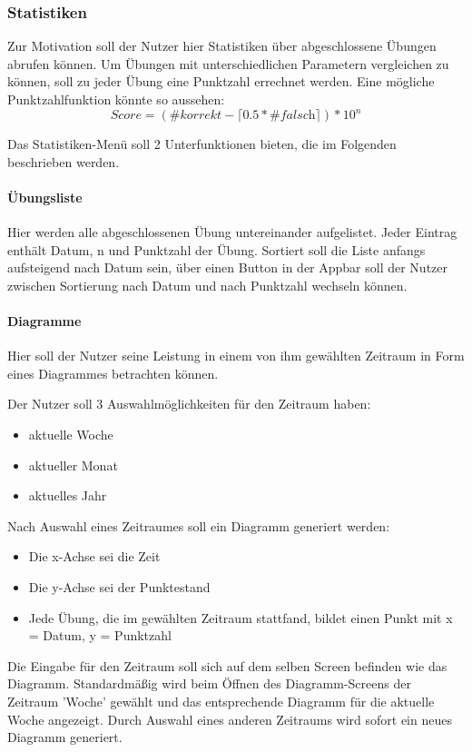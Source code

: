 \subsubsection{Statistiken}\label{statistiken}
Zur Motivation soll der Nutzer hier Statistiken über abgeschlossene Übungen abrufen können.
Um Übungen mit unterschiedlichen Parametern vergleichen zu können, soll zu jeder Übung
eine Punktzahl errechnet werden.
Eine mögliche Punktzahlfunktion könnte so aussehen:\label{score}
$$
  \textit{Score} = (\textit{\#korrekt} - \lceil 0.5 * \textit{\#falsch} \rceil) * 10^n
$$

\noindent Das Statistiken-Menü  soll 2 Unterfunktionen bieten, die im Folgenden
beschrieben werden.

\paragraph{Übungsliste}
Hier werden alle abgeschlossenen Übung untereinander aufgelistet.
Jeder Eintrag enthält Datum, n und Punktzahl der Übung.
Sortiert soll die Liste anfangs aufsteigend nach Datum sein,
über einen Button in der Appbar soll der Nutzer zwischen Sortierung nach Datum und nach Punktzahl wechseln können.

\paragraph{Diagramme}
Hier soll der Nutzer seine Leistung in einem von ihm gewählten Zeitraum in Form eines Diagrammes
betrachten können.

\begin{samepage}
\noindent Der Nutzer soll 3 Auswahlmöglichkeiten für den Zeitraum haben:
\begin{itemize}[itemsep=0pt]
  \item aktuelle Woche
  \item aktueller Monat
  \item aktuelles Jahr
\end{itemize}
\end{samepage}
Nach Auswahl eines Zeitraumes soll ein Diagramm generiert werden:
\begin{itemize}[itemsep=0pt]
  \item Die x-Achse sei die Zeit
  \item Die y-Achse sei der Punktestand
  \item Jede Übung, die im gewählten Zeitraum stattfand, bildet einen Punkt mit x = Datum, y = Punktzahl
\end{itemize}
Die Eingabe für den Zeitraum soll sich auf dem selben Screen befinden wie das Diagramm. Standardmäßig wird beim Öffnen
des Diagramm-Screens der Zeitraum 'Woche' gewählt und das entsprechende Diagramm für die aktuelle Woche angezeigt.
Durch Auswahl eines anderen Zeitraums wird sofort ein neues Diagramm generiert.
\newpage

